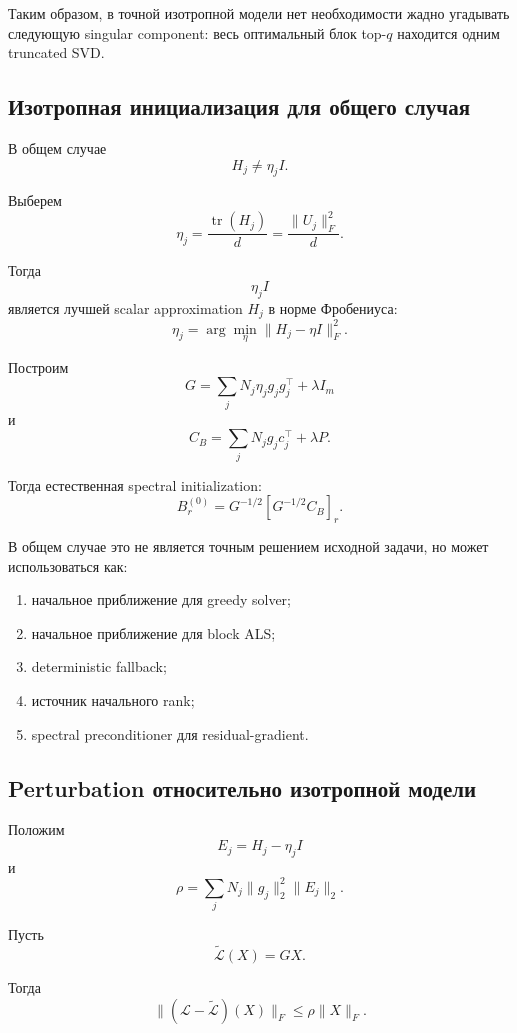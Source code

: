 Таким образом, в точной изотропной модели нет необходимости
жадно угадывать следующую singular component:
весь оптимальный блок top-$q$ находится одним truncated SVD.

\subsection{Изотропная инициализация для общего случая}

В общем случае
\[
    H_j\neq\eta_jI.
\]

Выберем
\[
\boxed{
    \eta_j
    =
    \frac{\operatorname{tr}(H_j)}{d}
    =
    \frac{\|U_j\|_F^2}{d}.
}
\]

Тогда
\[
    \eta_jI
\]
является лучшей scalar approximation $H_j$
в норме Фробениуса:
\[
\boxed{
    \eta_j
    =
    \arg\min_\eta
    \|H_j-\eta I\|_F^2.
}
\]

Построим
\[
\boxed{
    G
    =
    \sum_j
    N_j\eta_jg_jg_j^\top
    +
    \lambda I_m
}
\]
и
\[
\boxed{
    C_B
    =
    \sum_j
    N_jg_jc_j^\top
    +
    \lambda P.
}
\]

Тогда естественная spectral initialization:
\[
\boxed{
    B_r^{(0)}
    =
    G^{-1/2}
    [G^{-1/2}C_B]_r.
}
\]

В общем случае это не является точным решением исходной задачи,
но может использоваться как:

\begin{enumerate}
    \item начальное приближение для greedy solver;
    \item начальное приближение для block ALS;
    \item deterministic fallback;
    \item источник начального rank;
    \item spectral preconditioner для residual-gradient.
\end{enumerate}

\subsection{Perturbation относительно изотропной модели}

Положим
\[
    E_j
    =
    H_j-\eta_jI
\]
и
\[
\boxed{
    \rho
    =
    \sum_j
    N_j
    \|g_j\|_2^2
    \|E_j\|_2.
}
\]

Пусть
\[
    \widetilde{\mathcal L}(X)=GX.
\]

Тогда
\[
\boxed{
    \|
        (\mathcal L-\widetilde{\mathcal L})(X)
    \|_F
    \le
    \rho\|X\|_F.
}
\]


